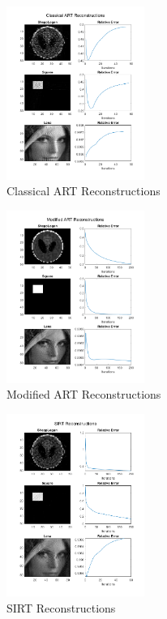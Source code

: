 \documentclass[journal]{IEEEtran}
\begin{document}
\begin{figure}[h]
	\centering
	\includegraphics[width=0.4\textwidth, height=0.5\textwidth]{images/classical_art.png}
	\caption{Classical ART Reconstructions}\label{fig:cart}
\end{figure}
\begin{figure}[h]
	\centering
	\includegraphics[width=0.4\textwidth, height=0.5\textwidth]{images/modifiedart.png}
	\caption{Modified ART Reconstructions}\label{fig:mart}
\end{figure}
\newpage
\begin{figure}[h]
	\centering
	\includegraphics[width=0.4\textwidth, height=0.5\textwidth]{images/sirt.png}
	\caption{SIRT Reconstructions}\label{fig:sirt}
\end{figure}
\end{document}
